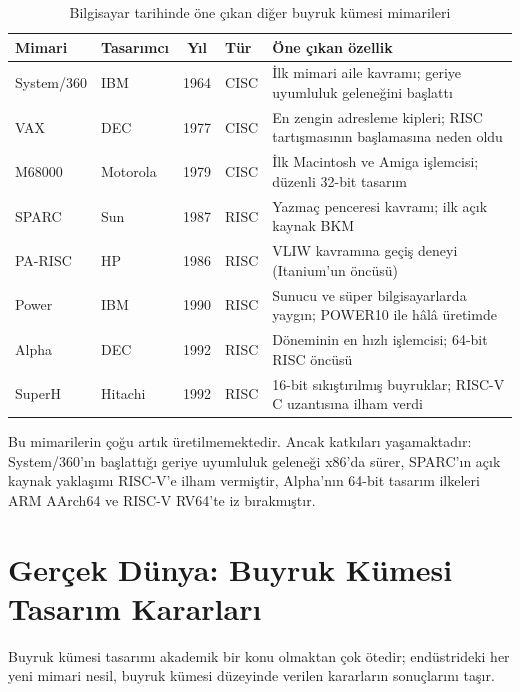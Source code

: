 \begin{table}[H]
\centering
\caption{Bilgisayar tarihinde öne çıkan diğer buyruk kümesi mimarileri}
\label{tab:diger-bkm-ozet}
\footnotesize
\begin{tabular}{llclp{5.8cm}}
\toprule
\textbf{Mimari} & \textbf{Tasarımcı} & \textbf{Yıl} & \textbf{Tür} & \textbf{Öne çıkan özellik} \\
\midrule
System/360\index{System/360} & IBM & 1964 & CISC & İlk mimari aile kavramı; geriye uyumluluk geleneğini başlattı \\[2pt]
VAX\index{VAX} & DEC & 1977 & CISC & En zengin adresleme kipleri; RISC tartışmasının başlamasına neden oldu \\[2pt]
M68000\index{Motorola 68000} & Motorola & 1979 & CISC & İlk Macintosh ve Amiga işlemcisi; düzenli 32-bit tasarım \\[2pt]
SPARC\index{SPARC} & Sun & 1987 & RISC & Yazmaç penceresi kavramı; ilk açık kaynak BKM \\[2pt]
PA-RISC\index{PA-RISC} & HP & 1986 & RISC & VLIW kavramına geçiş deneyi (Itanium'un öncüsü) \\[2pt]
Power\index{Power Architecture} & IBM & 1990 & RISC & Sunucu ve süper bilgisayarlarda yaygın; POWER10 ile hâlâ üretimde \\[2pt]
Alpha\index{DEC Alpha} & DEC & 1992 & RISC & Döneminin en hızlı işlemcisi; 64-bit RISC öncüsü \\[2pt]
SuperH\index{SuperH} & Hitachi & 1992 & RISC & 16-bit sıkıştırılmış buyruklar; RISC-V C uzantısına ilham verdi \\
\bottomrule
\end{tabular}
\end{table}

Bu mimarilerin çoğu artık üretilmemektedir. Ancak katkıları yaşamaktadır: System/360'ın başlattığı geriye uyumluluk geleneği x86'da sürer, SPARC'ın açık kaynak yaklaşımı RISC-V'e ilham vermiştir, Alpha'nın 64-bit tasarım ilkeleri ARM AArch64 ve RISC-V RV64'te iz bırakmıştır.


\section{Gerçek Dünya: Buyruk Kümesi Tasarım Kararları}
\label{sec:buyruk-gercek-dunya}

Buyruk kümesi tasarımı akademik bir konu olmaktan çok ötedir; endüstrideki her yeni mimari nesil, buyruk kümesi düzeyinde verilen kararların sonuçlarını taşır.

